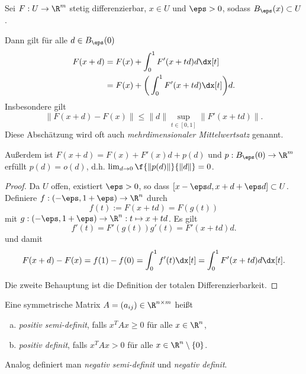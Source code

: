 \begin{lem} \label{2.4}
	Sei $F: U \to \R^m$ stetig differenzierbar, $x\in U$ und $\eps > 0$, sodass $B_\eps(x) \subset U$.

	Dann gilt für alle $d \in B_\eps(0)$
	\begin{align*}
		F(x+d)
		&= F(x) + \int_0^1 F'(x+td) d \dx[t] \\
		&= F(x) + \bigg( \int_0^1 F'(x+td) \dx[t] \bigg) d.
	\end{align*}
	Insbesondere gilt
	\[
		\| F(x+d) - F(x) \|
		\le \|d\| \sup_{t\in [0,1]} \|F'(x+td)\|.
	\]
	Diese Abschätzung wird oft auch \emph{mehrdimensionaler Mittelwertsatz} genannt.

	Außerdem ist $F(x+d) = F(x) + F'(x)d + p(d)$ und $p: B_\eps(0) \to \R^m$ erfüllt $p(d) = o(d)$, d.h.
	$\lim_{d\to 0} \f {\|p(d)\|}{\|d\|} = 0$.

	\begin{proof}
		Da $U$ offen, existiert $\eps > 0$, so dass $[x- \eps d, x + d + \eps d] \subset U$.
		Definiere $f: (-\eps, 1 + \eps) \to \R^n$ durch
		\[
			f(t) := F(x + td) = F(g(t))
		\]
		mit $g:(-\eps, 1 + \eps) \to \R^n : t \mapsto x + td$.
		Es gilt
		\[
			f'(t)
			= F'(g(t)) g'(t)
			= F'(x + td) d.
		\]
		und damit
		\[
			F(x+d) - F(x)
			= f(1) - f(0)
			= \int_0^1 f'(t) \dx[t]
			= \int_0^1 F'(x + td) d \dx[t].
		\]

		Die zweite Behauptung ist die Definition der totalen Differenzierbarkeit.
	\end{proof}
\end{lem}

\begin{df} \label{2.5}
	Eine symmetrische Matrix $A = (a_{ij}) \in \R^{n\times m}$ heißt
	\begin{enumerate}[(a)]
		\item
			\emph{positiv semi-definit}, falls $x^TAx \ge 0$ für alle $x \in \R^n$,
		\item
			\emph{positiv definit}, falls $x^TAx > 0$ für alle $x \in \R^n \setminus \{0\}$.
	\end{enumerate}
	Analog definiert man \emph{negativ semi-definit} und \emph{negativ definit}.
\end{df}


